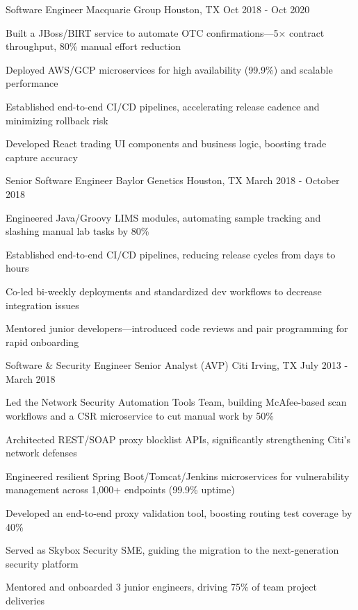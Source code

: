 \begin{cventries}
  \cventry
    {Software Engineer}
    {Macquarie Group}
    {Houston, TX}
    {Oct 2018 - Oct 2020}
    {
      \begin{cvitems}
        \item {Built a JBoss/BIRT service to automate OTC confirmations—5× contract throughput, 80\% manual effort reduction}
        \item {Deployed AWS/GCP microservices for high availability (99.9\%) and scalable performance}
        \item {Established end-to-end CI/CD pipelines, accelerating release cadence and minimizing rollback risk}
        \item {Developed React trading UI components and business logic, boosting trade capture accuracy}
      \end{cvitems}
    }

  \cventry
    {Senior Software Engineer}
    {Baylor Genetics}
    {Houston, TX}
    {March 2018 - October 2018}
    {
      \begin{cvitems}
        \item {Engineered Java/Groovy LIMS modules, automating sample tracking and slashing manual lab tasks by 80\%}
        \item {Established end-to-end CI/CD pipelines, reducing release cycles from days to hours}
        \item {Co-led bi-weekly deployments and standardized dev workflows to decrease integration issues}
        \item {Mentored junior developers—introduced code reviews and pair programming for rapid onboarding}
      \end{cvitems}
    }

  \cventry
    {Software \& Security Engineer Senior Analyst (AVP)}
    {Citi}
    {Irving, TX}
    {July 2013 - March 2018}
    {
      \begin{cvitems}
        \item {Led the Network Security Automation Tools Team, building McAfee‑based scan workflows and a CSR microservice to cut manual work by 50\%}
        \item {Architected REST/SOAP proxy blocklist APIs, significantly strengthening Citi’s network defenses}
        \item {Engineered resilient Spring Boot/Tomcat/Jenkins microservices for vulnerability management across 1,000+ endpoints (99.9\% uptime)}
        \item {Developed an end-to-end proxy validation tool, boosting routing test coverage by 40\%}
        \item {Served as Skybox Security SME, guiding the migration to the next-generation security platform}
        \item {Mentored and onboarded 3 junior engineers, driving 75\% of team project deliveries}
      \end{cvitems}
    }

\end{cventries}

